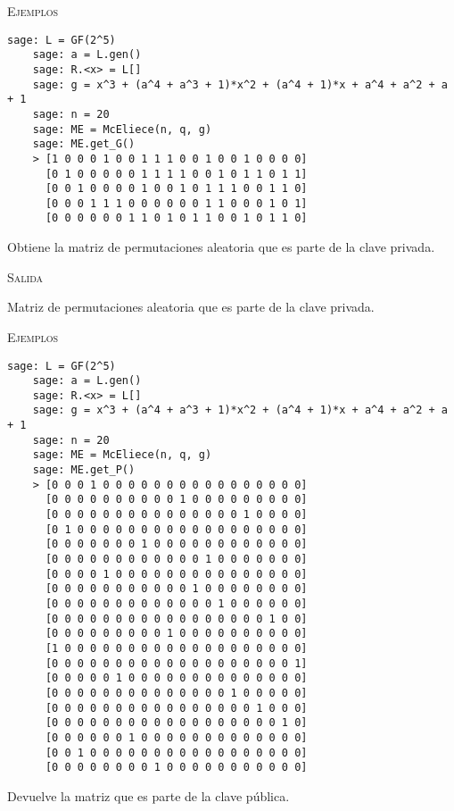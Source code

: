 \begin{description}[leftmargin=1em, font=\normalfont\ttfamily, style=nextline]
\begin{description}[font=\ttfamily, style=nextline]
  \textsc{Ejemplos}
  \begin{lstlisting}[gobble=4]
    sage: L = GF(2^5)
    sage: a = L.gen()
    sage: R.<x> = L[]
    sage: g = x^3 + (a^4 + a^3 + 1)*x^2 + (a^4 + 1)*x + a^4 + a^2 + a + 1
    sage: n = 20
    sage: ME = McEliece(n, q, g)
    sage: ME.get_G()
    > [1 0 0 0 1 0 0 1 1 1 0 0 1 0 0 1 0 0 0 0]
      [0 1 0 0 0 0 0 1 1 1 1 0 0 1 0 1 1 0 1 1]
      [0 0 1 0 0 0 0 1 0 0 1 0 1 1 1 0 0 1 1 0]
      [0 0 0 1 1 1 0 0 0 0 0 0 1 1 0 0 0 1 0 1]
      [0 0 0 0 0 0 1 1 0 1 0 1 1 0 0 1 0 1 1 0]
  \end{lstlisting}

  \item[get\_P(self)] Obtiene la matriz de permutaciones aleatoria que es parte de la clave privada.
  
  \textsc{Salida}
  \begin{description}[font=\normalfont\ttfamily]
    \item[] Matriz de permutaciones aleatoria que es parte de la clave privada.
  \end{description}

  \textsc{Ejemplos}
  \begin{lstlisting}[gobble=4]
    sage: L = GF(2^5)
    sage: a = L.gen()
    sage: R.<x> = L[]
    sage: g = x^3 + (a^4 + a^3 + 1)*x^2 + (a^4 + 1)*x + a^4 + a^2 + a + 1
    sage: n = 20
    sage: ME = McEliece(n, q, g)
    sage: ME.get_P()
    > [0 0 0 1 0 0 0 0 0 0 0 0 0 0 0 0 0 0 0 0]
      [0 0 0 0 0 0 0 0 0 0 1 0 0 0 0 0 0 0 0 0]
      [0 0 0 0 0 0 0 0 0 0 0 0 0 0 0 1 0 0 0 0]
      [0 1 0 0 0 0 0 0 0 0 0 0 0 0 0 0 0 0 0 0]
      [0 0 0 0 0 0 0 1 0 0 0 0 0 0 0 0 0 0 0 0]
      [0 0 0 0 0 0 0 0 0 0 0 0 1 0 0 0 0 0 0 0]
      [0 0 0 0 1 0 0 0 0 0 0 0 0 0 0 0 0 0 0 0]
      [0 0 0 0 0 0 0 0 0 0 0 1 0 0 0 0 0 0 0 0]
      [0 0 0 0 0 0 0 0 0 0 0 0 0 1 0 0 0 0 0 0]
      [0 0 0 0 0 0 0 0 0 0 0 0 0 0 0 0 0 1 0 0]
      [0 0 0 0 0 0 0 0 0 1 0 0 0 0 0 0 0 0 0 0]
      [1 0 0 0 0 0 0 0 0 0 0 0 0 0 0 0 0 0 0 0]
      [0 0 0 0 0 0 0 0 0 0 0 0 0 0 0 0 0 0 0 1]
      [0 0 0 0 0 1 0 0 0 0 0 0 0 0 0 0 0 0 0 0]
      [0 0 0 0 0 0 0 0 0 0 0 0 0 0 1 0 0 0 0 0]
      [0 0 0 0 0 0 0 0 0 0 0 0 0 0 0 0 1 0 0 0]
      [0 0 0 0 0 0 0 0 0 0 0 0 0 0 0 0 0 0 1 0]
      [0 0 0 0 0 0 1 0 0 0 0 0 0 0 0 0 0 0 0 0]
      [0 0 1 0 0 0 0 0 0 0 0 0 0 0 0 0 0 0 0 0]
      [0 0 0 0 0 0 0 0 1 0 0 0 0 0 0 0 0 0 0 0]
  \end{lstlisting}

  \item[get\_public\_key(self)] Devuelve la matriz que es parte de la clave pública.


\end{description}
\end{description}
